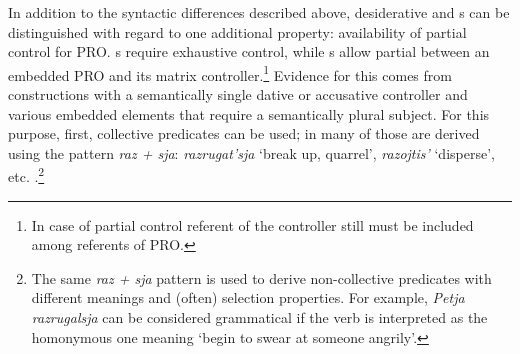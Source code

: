 \documentclass[output=paper,colorlinks,citecolor=brown,newtxmath]{langsci/langscibook}
\begin{document}
\ea\label{ex8}
\z
\z

\ea\label{ex9}
\z
\z

\noindent In addition to the syntactic differences described above, desiderative and s can be distinguished with regard to one additional property: availability of partial control for PRO. s require exhaustive control, while s allow partial  between an embedded PRO and its matrix controller.\footnote{In case of partial control referent of the controller still must be included among referents of PRO.} Evidence for this comes from constructions with a semantically single dative or accusative controller and various embedded elements that require a semantically plural subject. For this purpose, first, collective predicates can be used; in  many of those are derived using the pattern \textit{raz + sja}: \textit{razrugat’sja} `break up, quarrel’, \textit{razojtis’} `disperse’, etc. .\footnote{The same \textit{raz + sja} pattern is used to derive non-collective predicates with different meanings and (often) selection properties. For example, \textit{Petja razrugalsja} can be considered grammatical if the verb is interpreted as the homonymous one meaning `begin to swear at someone angrily’.}


\ea\label{ex10}
\z
\z
\end{document}
